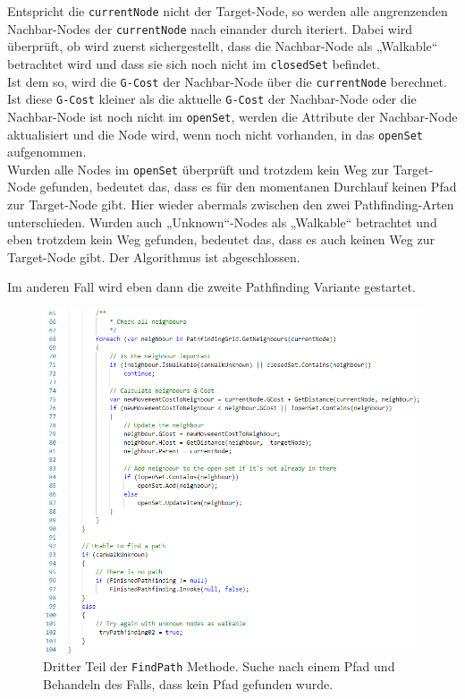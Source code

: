 \documentclass[a4paper,12pt]{article}
\newcommand{\code}{\texttt}
\begin{document}
Entspricht die \code{currentNode} nicht der Target-Node, so werden alle angrenzenden Nachbar-Nodes der \code{currentNode} nach einander durch iteriert. Dabei wird überprüft, ob wird zuerst sichergestellt, dass die Nachbar-Node als „Walkable“ betrachtet wird und dass sie sich noch nicht im \code{closedSet} befindet.
\\[0.4cm]
Ist dem so, wird die \code{G-Cost} der Nachbar-Node über die \code{currentNode} berechnet. Ist diese \code{G-Cost} kleiner als die aktuelle \code{G-Cost} der Nachbar-Node oder die Nachbar-Node ist noch nicht im \code{openSet}, werden die Attribute der Nachbar-Node aktualisiert und die Node wird, wenn noch nicht vorhanden, in das \code{openSet} aufgenommen.
\\[0.4cm]
Wurden alle Nodes im \code{openSet} überprüft und trotzdem kein Weg zur Target-Node gefunden, bedeutet das, dass es für den momentanen Durchlauf keinen Pfad zur Target-Node gibt. Hier wieder abermals zwischen den zwei Pathfinding-Arten unterschieden. Wurden auch „Unknown“-Nodes als „Walkable“ betrachtet und eben trotzdem kein Weg gefunden, bedeutet das, dass es auch keinen Weg zur Target-Node gibt. Der Algorithmus ist abgeschlossen. 

Im anderen Fall wird eben dann die zweite Pathfinding Variante gestartet.
\begin{figure}[H]
    \centering
    \includegraphics[width=1\linewidth]{Bilder/Aufgabe3/Teilaufgabe_C/Pathfinding_03.png}
    \caption{Dritter Teil der \code{FindPath} Methode. Suche nach einem Pfad und Behandeln des Falls, dass kein Pfad gefunden wurde.}
\end{figure}
\end{document}
